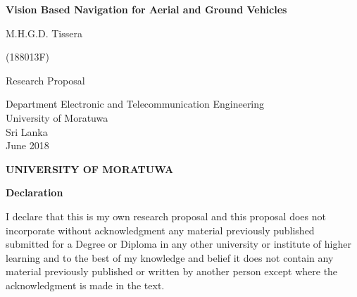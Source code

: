 \documentclass[a4paper,oneside,12pt]{report}
\begin{document}
\begin{titlepage}
	\begin{center}
		\vspace*{5cm}
		
		\huge
		\textbf{Vision Based Navigation for Aerial and Ground Vehicles }
		
		\vspace{0.5cm}
		
		\large
		\vspace{0.5cm}
		
		M.H.G.D. Tissera
		
		\vspace{0.5cm}
		
		(188013F)
		\vfill
		
		\normalsize
		Research Proposal 
		
		\vspace{0.8cm}
		\large
		
		Department Electronic and Telecommunication Engineering\\
		\vspace{0.8cm}
		University of Moratuwa\\
		Sri Lanka\\
		\vspace{0.8cm}
		June 2018
		
	\end{center}
\end{titlepage}


\setlength{\parskip}{1em}


\begin{center}
\huge
\textbf{UNIVERSITY OF MORATUWA}
\end{center}

\begin{flushleft}
\large
\textbf{Declaration}
\end{flushleft}
\setlength{\parindent}{0cm}

I declare that this is my own research proposal and this proposal does not incorporate without acknowledgment any material previously published submitted for a Degree or Diploma in any other university or institute of higher learning and to the best of my knowledge and belief it does not contain any material previously published or written by another person except where the acknowledgment is made in the text.
\end{document}
